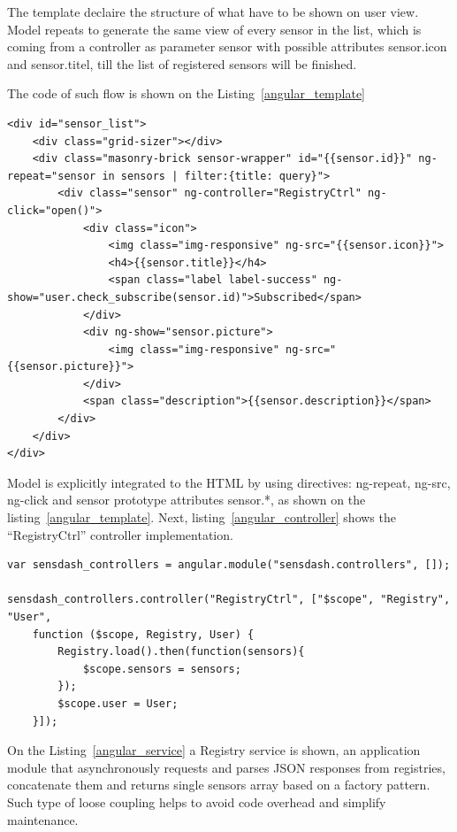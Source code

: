     The template declaire the structure of what have to be shown on user view. Model repeats to generate the same view of every sensor in the list, which is coming from a controller as parameter {{sensor}} with possible attributes {{sensor.icon}} and {{sensor.titel}}, till the list of registered sensors will be finished.

    The code of such flow is shown on the Listing~\ref{angular_template}
    \begin{lstlisting}[label=angular_template,caption=Template registry.html]
<div id="sensor_list">
    <div class="grid-sizer"></div>
    <div class="masonry-brick sensor-wrapper" id="{{sensor.id}}" ng-repeat="sensor in sensors | filter:{title: query}">
        <div class="sensor" ng-controller="RegistryCtrl" ng-click="open()">
            <div class="icon">
                <img class="img-responsive" ng-src="{{sensor.icon}}">
                <h4>{{sensor.title}}</h4>
                <span class="label label-success" ng-show="user.check_subscribe(sensor.id)">Subscribed</span>
            </div>
            <div ng-show="sensor.picture">
                <img class="img-responsive" ng-src="{{sensor.picture}}">
            </div>
            <span class="description">{{sensor.description}}</span>
        </div>
    </div>
</div>
    \end{lstlisting}

    Model is explicitly integrated to the HTML by using directives: ng-repeat, ng-src, ng-click and sensor prototype attributes {{sensor.*}}, as shown on the listing~\ref{angular_template}. Next, listing~\ref{angular_controller} shows the ``RegistryCtrl'' controller implementation.

    \begin{lstlisting}[label=angular_controller,caption=Controller controller.js]
var sensdash_controllers = angular.module("sensdash.controllers", []);

sensdash_controllers.controller("RegistryCtrl", ["$scope", "Registry", "User",
    function ($scope, Registry, User) {
        Registry.load().then(function(sensors){
            $scope.sensors = sensors;
        });
        $scope.user = User;
    }]);
    \end{lstlisting}

	On the Listing~\ref{angular_service} a Registry service is shown, an application module that asynchronously requests and parses JSON responses from registries, concatenate them and returns single sensors array based on a factory pattern. Such type of loose coupling helps to avoid code overhead and simplify maintenance.  

